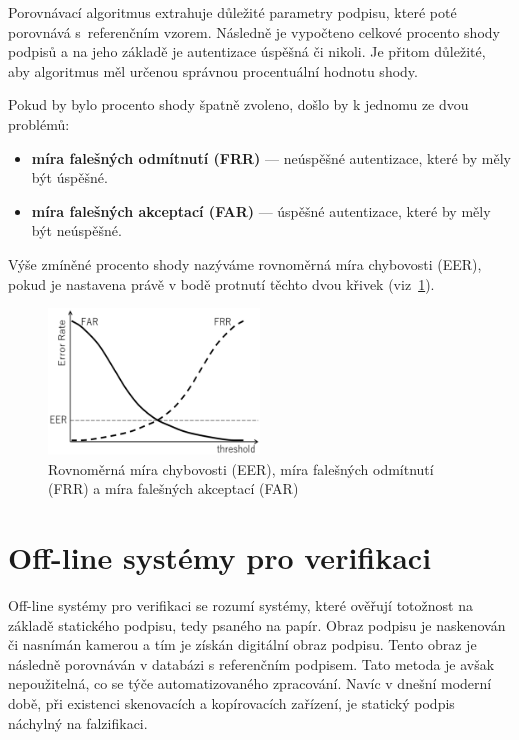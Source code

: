 Porovnávací algoritmus extrahuje důležité parametry podpisu, které poté porovnává s~referenčním vzorem. 
Následně je vypočteno celkové procento shody podpisů a na jeho základě je autentizace úspěšná či nikoli.
Je přitom důležité, aby algoritmus měl určenou správnou procentuální hodnotu shody. 

Pokud by bylo procento shody špatně zvoleno, došlo by k jednomu ze dvou problémů:
\begin{itemize}
  \item \textbf{míra falešných odmítnutí (FRR)} --- neúspěšné autentizace, které by měly být úspěšné.
  \item \textbf{míra falešných akceptací (FAR)} --- úspěšné autentizace, které by měly být neúspěšné.
\end{itemize}

Výše zmíněné procento shody nazýváme rovnoměrná míra chybovosti (EER), pokud je nastavena právě v bodě protnutí těchto dvou křivek (viz~\ref{fig:FAR_FRR}).

\begin{figure}[h]
  \centering
  \includegraphics[width=0.5\textwidth]{obrazky-figures/FAR_FRR.png}
  \caption{Rovnoměrná míra chybovosti (EER), míra falešných odmítnutí (FRR) a míra falešných akceptací (FAR)} %
  \label{fig:FAR_FRR}
\end{figure}

\newpage

\section{Off-line systémy pro verifikaci}
Off-line systémy pro verifikaci se rozumí systémy, které ověřují totožnost na základě statického podpisu, tedy psaného na papír.  %
Obraz podpisu je naskenován či nasnímán kamerou a tím je získán digitální obraz podpisu.                                          %
Tento obraz je následně porovnáván v databázi s referenčním podpisem.                                                             %
Tato metoda je avšak nepoužitelná, co se týče automatizovaného zpracování.                                                        %
Navíc v dnešní moderní době, při existenci skenovacích a kopírovacích zařízení, je statický podpis náchylný na falzifikaci.       %

